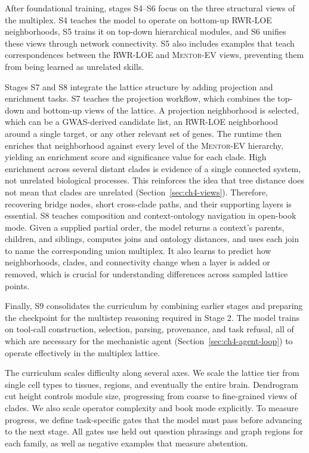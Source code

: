 After foundational training, stages S4--S6 focus on the three structural views of the multiplex. S4 teaches the model to operate on bottom-up RWR-LOE neighborhoods, S5 trains it on top-down hierarchical modules, and S6 unifies these views through network connectivity. S5 also includes examples that teach correspondences between the RWR-LOE and \textsc{Mentor-EV} views, preventing them from being learned as unrelated skills.

Stages S7 and S8 integrate the lattice structure by adding projection and enrichment tasks. S7 teaches the projection workflow, which combines the top-down and bottom-up views of the lattice. A projection neighborhood is selected, which can be a GWAS-derived candidate list, an RWR-LOE neighborhood around a single target, or any other relevant set of genes. The runtime then enriches that neighborhood against every level of the \textsc{Mentor-EV} hierarchy, yielding an enrichment score and significance value for each clade. High enrichment across several distant clades is evidence of a single connected system, not unrelated biological processes. This reinforces the idea that tree distance does not mean that clades are unrelated (Section~\ref{sec:ch4-views}). Therefore, recovering bridge nodes, short cross-clade paths, and their supporting layers is essential. S8 teaches composition and context-ontology navigation in open-book mode. Given a supplied partial order, the model returns a context's parents, children, and siblings, computes joins and ontology distances, and uses each join to name the corresponding union multiplex. It also learns to predict how neighborhoods, clades, and connectivity change when a layer is added or removed, which is crucial for understanding differences across sampled lattice points.

Finally, S9 consolidates the curriculum by combining earlier stages and preparing the checkpoint for the multistep reasoning required in Stage 2. The model trains on tool-call construction, selection, parsing, provenance, and task refusal, all of which are necessary for the mechanistic agent (Section~\ref{sec:ch4-agent-loop}) to operate effectively in the multiplex lattice.

The curriculum scales difficulty along several axes. We scale the lattice tier from single cell types to tissues, regions, and eventually the entire brain. Dendrogram cut height controls module size, progressing from coarse to fine-grained views of clades. We also scale operator complexity and book mode explicitly. To measure progress, we define task-specific gates that the model must pass before advancing to the next stage. All gates use held out question phrasings and graph regions for each family, as well as negative examples that measure abstention.

